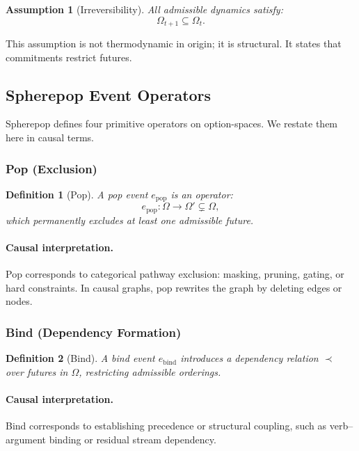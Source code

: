\documentclass[11pt]{article}
\newtheorem{definition}{Definition}
\newtheorem{assumption}{Assumption}
\theoremstyle{remark}
\begin{document}
\begin{assumption}[Irreversibility]
All admissible dynamics satisfy:
\[
\Omega_{t+1} \subseteq \Omega_t.
\]
\end{assumption}

This assumption is not thermodynamic in origin; it is structural. It
states that commitments restrict futures.

\subsection{Spherepop Event Operators}

Spherepop defines four primitive operators on option-spaces. We restate
them here in causal terms.

\subsubsection{Pop (Exclusion)}

\begin{definition}[Pop]
A pop event $e_{\text{pop}}$ is an operator:
\[
e_{\text{pop}} : \Omega \to \Omega' \subsetneq \Omega,
\]
which permanently excludes at least one admissible future.
\end{definition}

\paragraph{Causal interpretation.}
Pop corresponds to categorical pathway exclusion: masking, pruning,
gating, or hard constraints. In causal graphs, pop rewrites the graph
by deleting edges or nodes.

\subsubsection{Bind (Dependency Formation)}

\begin{definition}[Bind]
A bind event $e_{\text{bind}}$ introduces a dependency relation
$\prec$ over futures in $\Omega$, restricting admissible orderings.
\end{definition}

\paragraph{Causal interpretation.}
Bind corresponds to establishing precedence or structural coupling,
such as verb–argument binding or residual stream dependency.
\end{document}
